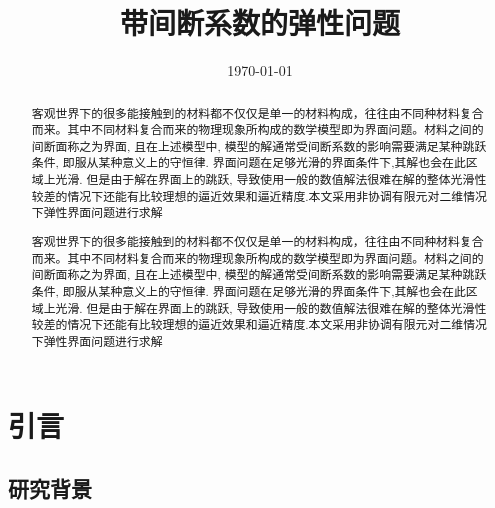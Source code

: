 \documentclass[a4paper,UTF8,titlepage]{ctexart}
\begin{document}
\title{带间断系数的弹性问题}
\date{\today}
\maketitle

\renewcommand{\abstractname}{\vspace{-2em}\large\bf 摘要}
\begin{abstract}
	客观世界下的很多能接触到的材料都不仅仅是单一的材料构成，往往由不同种材料复合而来。其中不同材料复合而来的物理现象所构成的数学模型即为界面问题。材料之间的间断面称之为界面, 且在上述模型中, 模型的解通常受间断系数的影响需要满足某种跳跃条件, 即服从某种意义上的守恒律. 界面问题在足够光滑的界面条件下,其解也会在此区域上光滑. 但是由于解在界面上的跳跃, 导致使用一般的数值解法很难在解的整体光滑性较差的情况下还能有比较理想的逼近效果和逼近精度.本文采用非协调有限元对二维情况下弹性界面问题进行求解  \\
\end{abstract}
\thispagestyle{empty}

\newpage

\renewcommand{\abstractname}{\vspace{-2em}\large\bf Abstractname}
\begin{abstract}
	客观世界下的很多能接触到的材料都不仅仅是单一的材料构成，往往由不同种材料复合而来。其中不同材料复合而来的物理现象所构成的数学模型即为界面问题。材料之间的间断面称之为界面, 且在上述模型中, 模型的解通常受间断系数的影响需要满足某种跳跃条件, 即服从某种意义上的守恒律. 界面问题在足够光滑的界面条件下,其解也会在此区域上光滑. 但是由于解在界面上的跳跃, 导致使用一般的数值解法很难在解的整体光滑性较差的情况下还能有比较理想的逼近效果和逼近精度.本文采用非协调有限元对二维情况下弹性界面问题进行求解  \\
\end{abstract}
\thispagestyle{empty}

\newpage

\tableofcontents

\newpage

\section{引言}

\subsection{研究背景}
\end{document}
